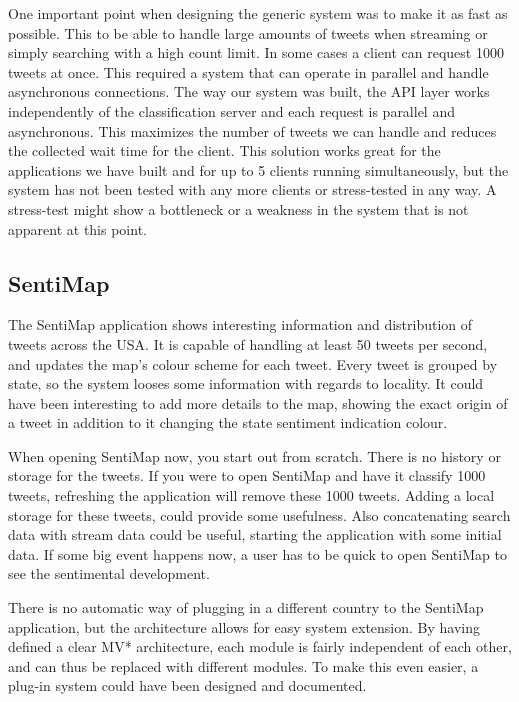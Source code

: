 One important point when designing the generic system was to make it as fast as possible. This to be able to handle large amounts of tweets when streaming or simply searching with a high count limit. In some cases a client can request 1000 tweets at once. This required a system that can operate in parallel and handle asynchronous connections. The way our system was built, the API layer works independently of the classification server and each request is parallel and asynchronous. This maximizes the number of tweets we can handle and reduces the collected wait time for the client. This solution works great for the applications we have built and for up to 5 clients running simultaneously, but the system has not been tested with any more clients or stress-tested in any way. A stress-test might show a bottleneck or a weakness in the system that is not apparent at this point. 

\subsection{SentiMap}

The SentiMap application shows interesting information and distribution of tweets across the USA. It is capable of handling at least 50 tweets per second, and updates the map's colour scheme for each tweet. Every tweet is grouped by state, so the system looses some information with regards to locality. It could have been interesting to add more details to the map, showing the exact origin of a tweet in addition to it changing the state sentiment indication colour.

When opening SentiMap now, you start out from scratch. There is no history or storage for the tweets. If you were to open SentiMap and have it classify 1000 tweets, refreshing the application will remove these 1000 tweets. Adding a local storage for these tweets, could provide some usefulness. Also concatenating search data with stream data could be useful, starting the application with some initial data. If some big event happens now, a user has to be quick to open SentiMap to see the sentimental development. 

There is no automatic way of plugging in a different country to the SentiMap application, but the architecture allows for easy system extension. By having defined a clear MV* architecture, each module is fairly independent of each other, and can thus be replaced with different modules. To make this even easier, a plug-in system could have been designed and documented. 

